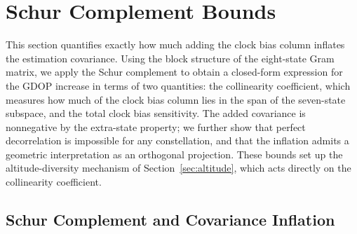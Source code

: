 \documentclass[letterpaper,times]{IONconf-v2}
\theoremstyle{plain}
\theoremstyle{remark}
\begin{document}
\vspace{-10pt}

\section{Schur Complement Bounds}\label{sec:schur}


This section quantifies exactly how much adding the clock bias column inflates the estimation covariance. Using the block structure of the eight-state Gram matrix, we apply the Schur complement to obtain a closed-form expression for the GDOP increase in terms of two quantities: the collinearity coefficient, which measures how much of the clock bias column lies in the span of the seven-state subspace, and the total clock bias sensitivity. The added covariance is nonnegative by the extra-state property; we further show that perfect decorrelation is impossible for any constellation, and that the inflation admits a geometric interpretation as an orthogonal projection. These bounds set up the altitude-diversity mechanism of Section~\ref{sec:altitude}, which acts directly on the collinearity coefficient.

\vspace{-10pt}

\subsection{Schur Complement and Covariance Inflation}\label{subsec:schur_complement}
\end{document}
